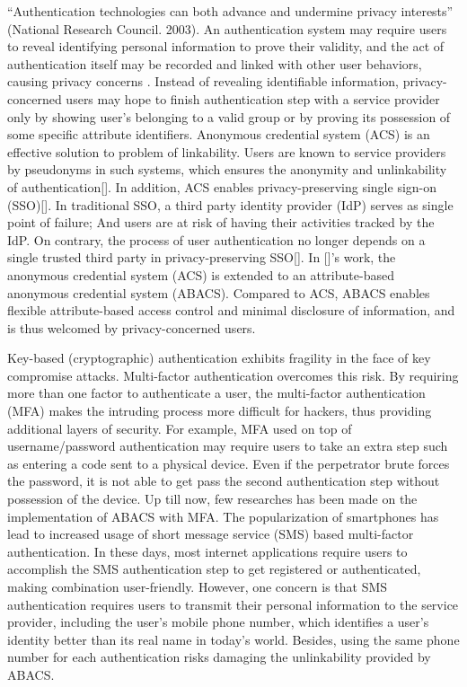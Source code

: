 ``Authentication technologies can both advance and undermine privacy interests'' (National Research Council. 2003). An authentication system may require users to reveal identifying personal information to prove their validity, and the act of authentication itself may be recorded and linked with other user behaviors, causing privacy concerns \cite{national2003goes}. Instead of revealing identifiable information, privacy-concerned users may hope to finish authentication step with a service provider only by showing user's belonging to a valid group or by proving its possession of some specific attribute identifiers\cite{holt2002selective}. Anonymous credential system (ACS) is an effective solution to problem of linkability. Users are known to service providers by pseudonyms in such systems, which ensures the anonymity and unlinkability of authentication[]. In addition, ACS enables privacy-preserving single sign-on (SSO)[]. In traditional SSO, a third party identity provider (IdP) serves as single point of failure; And users are at risk of having their activities tracked by the IdP. On contrary, the process of user authentication no longer depends on a single trusted third party in privacy-preserving SSO[]. In []'s work, the anonymous credential system (ACS) is extended to an attribute-based anonymous credential system (ABACS). Compared to ACS, ABACS enables flexible attribute-based access control and minimal disclosure of information, and is thus welcomed by privacy-concerned users.

Key-based (cryptographic) authentication exhibits fragility in the face of key compromise attacks. Multi-factor authentication overcomes this risk. By requiring more than one factor to authenticate a user, the multi-factor authentication (MFA) makes the intruding process more difficult for hackers, thus providing additional layers of security. For example, MFA used on top of username/password authentication may require users to take an extra step such as entering a code sent to a physical device. Even if the perpetrator brute forces the password, it is not able to get pass the second authentication step without possession of the device. Up till now, few researches has been made on the implementation of ABACS with MFA. The popularization of smartphones has lead to increased usage of short message service (SMS) based multi-factor authentication. In these days, most internet applications require users to accomplish the SMS authentication step to get registered or authenticated, making combination user-friendly. However, one concern is that SMS authentication requires users to transmit their personal information to the service provider, including the user's mobile phone number, which identifies a user's identity better than its real name in today's world. Besides, using the same phone number for each authentication risks damaging the unlinkability provided by ABACS. 

